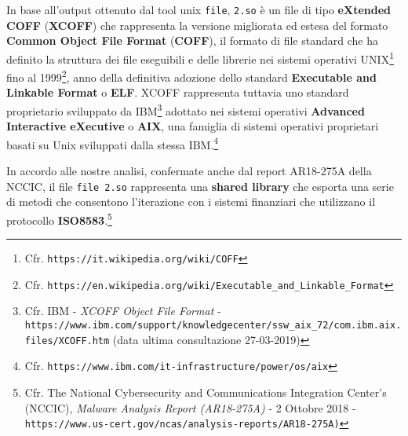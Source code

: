 \documentclass[10pt,a4paper, titlepage]{report}
\begin{document}
In base all'output ottenuto dal tool unix \texttt{file}, \texttt{2.so} è un file di tipo \textbf{eXtended COFF} (\textbf{XCOFF}) che rappresenta la versione migliorata ed estesa del formato \textbf{Common Object File Format} (\textbf{COFF}), il formato di file standard che ha definito la struttura dei file eseguibili e delle librerie nei sistemi operativi UNIX\footnote{Cfr. \texttt{https://it.wikipedia.org/wiki/COFF}} fino al 1999\footnote{Cfr. \texttt{https://en.wikipedia.org/wiki/Executable\_and\_Linkable\_Format}}, anno della definitiva adozione dello standard \textbf{Executable and Linkable Format} o \textbf{ELF}.
XCOFF rappresenta tuttavia uno standard proprietario sviluppato da IBM\footnote{Cfr. IBM - \textit{XCOFF Object File Format} - \texttt{https://www.ibm.com/support/knowledgecenter/ssw\_aix\_72/com.ibm.aix.files/XCOFF.htm} (data ultima consultazione 27-03-2019)} adottato nei sistemi operativi \textbf{Advanced Interactive eXecutive} o \textbf{AIX}, una famiglia di sistemi operativi proprietari basati su Unix sviluppati dalla stessa IBM.\footnote{Cfr. \texttt{https://www.ibm.com/it-infrastructure/power/os/aix}}

In accordo alle nostre analisi, confermate anche dal report AR18-275A della NCCIC, il file \texttt{file 2.so} rappresenta una \textbf{shared library} che esporta una serie di metodi che consentono l'iterazione con i sistemi finanziari che utilizzano il protocollo \textbf{ISO8583}.\footnote{Cfr. The National Cybersecurity and Communications Integration Center’s (NCCIC), \textit{Malware Analysis Report (AR18-275A)} - 2 Ottobre 2018 - \texttt{https://www.us-cert.gov/ncas/analysis-reports/AR18-275A)}}
\end{document}
